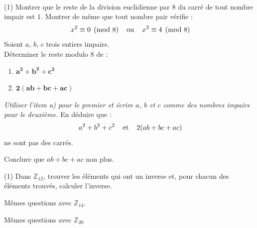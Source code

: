 \begin{exstheorie}
	
	\exo
	~
	
	\vspace{-7mm}
	\begin{tasks}[label=\alph*),item-indent=6mm,column-sep=0mm ,after-item-skip=5mm,label-offset=2mm,label-align=right](1)
		\task Montrer que le reste de la division euclidienne par $8$ du carré de tout
		nombre impair est $1$.
		\task Montrer de même que tout nombre pair vérifie :
		$$x^{2}\equiv 0\pmod{8} \ou{4} x^{2}\equiv 4\pmod{8}$$\vspace{-4mm}
		\task Soient $a$, $b$, $c$ trois entiers impairs.\\
		Déterminer le reste modulo $8$ de :
		\begin{enumerate}[itemsep=1mm]
			\item[] $\bm{a^{2}+b^{2}+c^{2}}$
			\item[] $\bm{2(ab+bc+ac)}$
		\end{enumerate}
		{\footnotesize \textsl{ Utiliser l'item a) pour le premier et écrire $a$, $b$ et $c$ comme des nombres impairs pour le deuxième.}} 
		\task En déduire que :
		$$a^{2}+b^{2}+c^{2} \et{4} 2(ab+bc+ac)$$
		ne sont pas des carrés.
		
		\medskip
		Conclure que $ab+bc+ac$ non plus.
	\end{tasks}
	
	
	\eexo
	
	\exo
	\begin{tasks}[after-item-skip=2mm,item-indent=5mm,column-sep=1mm,label-offset=1mm](1)
		\task Dans $\mathbb{Z}_{12}$, trouver les éléments qui ont un inverse et, pour chacun des éléments trouvés, calculer l'inverse.
		
		\task Mêmes questions avec $\mathbb{Z}_{14}$.
		
		\task Mêmes questions avec $\mathbb{Z}_{20}$
	\end{tasks}
	
\end{exstheorie}
\pagebreak
%

